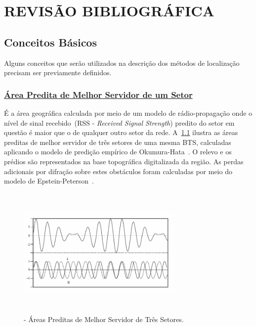 \chapter{REVISÃO BIBLIOGRÁFICA}
\label{chapter:exemplo}

\section{\textbf{Conceitos Básicos}}
\label{sec:Cap1Conceitos}

Alguns conceitos que serão utilizados na descrição dos métodos de localização precisam ser previamente definidos.

\subsection{\underline{Área Predita de Melhor Servidor de um Setor}}
É a área geográfica calculada por meio de um modelo de rádio-propagação onde o nível de sinal recebido~(RSS - \textit{Received Signal Strength}) predito do setor em questão é maior que o de qualquer outro setor da rede. A~\ref{fig:bestserverarea} ilustra as áreas preditas de melhor servidor de três setores de uma mesma BTS, calculadas aplicando o modelo de predição empírico de Okumura-Hata~\cite{HATA1980}. O relevo e os prédios são representados na base topográfica digitalizada da região. As perdas adicionais por difração sobre estes obstáculos foram calculadas por meio do modelo de Epstein-Peterson~\cite{MDY1993}.

\begin{figure}[H]
\begin{center}
\includegraphics[width=8cm,height=6.4cm]{./02_Cap1/figures/fig_06_br.png}
\caption{\label{fig:bestserverarea}- Áreas Preditas de Melhor Servidor de Três Setores.}
\end{center}
\end{figure}

